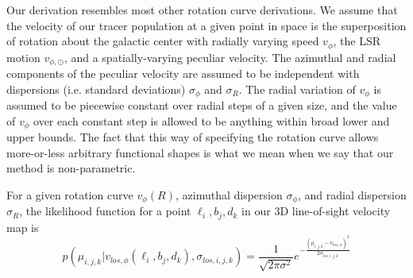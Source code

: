 Our derivation resembles most other rotation curve derivations. We assume that the velocity of our tracer population at a given point in space is the superposition of rotation about the galactic center with radially varying speed $v_\phi$, the LSR motion $v_{\phi, \odot}$, and a spatially-varying peculiar velocity. The azimuthal and radial components of the peculiar velocity are assumed to be independent with dispersions (i.e. standard deviations) $\sigma_\phi$ and $\sigma_R$. The radial variation of $v_\phi$ is assumed to be piecewise constant over radial steps of a given size, and the value of $v_\phi$ over each constant step is allowed to be anything within broad lower and upper bounds. The fact that this way of specifying the rotation curve allows more-or-less arbitrary functional shapes is what we mean when we say that our method is non-parametric.

For a given rotation curve $v_\phi(R)$, azimuthal dispersion $\sigma_\phi$, and radial dispersion $\sigma_R$, the likelihood function for a point $\ell_i,b_j,d_k$ in our 3D line-of-sight velocity map is 
\begin{equation}
\label{eqn:rotcurve_likelihood}
p(\mu_{i,j,k} \vert v_{los, \phi}(\ell_i, b_j, d_k), \sigma_{los, i, j, k}) = \frac{1}{\sqrt{2 \pi \sigma^2}} e^{- \frac{(\mu_{i,j,k} - v_{los, \phi})^2}{2 \sigma_{los, i, j ,k}}}
\end{equation}

